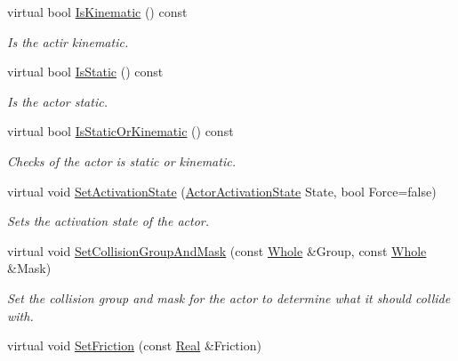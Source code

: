 \begin{DoxyCompactItemize}
virtual bool \hyperlink{classphys_1_1ActorBasePhysicsSettings_a8128bcfc407909a57026eb38812b1d1d}{IsKinematic} () const 
\begin{DoxyCompactList}\small\item\em Is the actir kinematic. \item\end{DoxyCompactList}\item 
virtual bool \hyperlink{classphys_1_1ActorBasePhysicsSettings_a68c32cbe7329e138c5ea11c5b098483f}{IsStatic} () const 
\begin{DoxyCompactList}\small\item\em Is the actor static. \item\end{DoxyCompactList}\item 
virtual bool \hyperlink{classphys_1_1ActorBasePhysicsSettings_a5fe007187584b836ada963f8a23eb377}{IsStaticOrKinematic} () const 
\begin{DoxyCompactList}\small\item\em Checks of the actor is static or kinematic. \item\end{DoxyCompactList}\item 
virtual void \hyperlink{classphys_1_1ActorBasePhysicsSettings_ab0b1760f3730e85470097d44985a5b56}{SetActivationState} (\hyperlink{namespacephys_a7d434b1a52cf5290a9ecc972b87a6a40}{ActorActivationState} State, bool Force=false)
\begin{DoxyCompactList}\small\item\em Sets the activation state of the actor. \item\end{DoxyCompactList}\item 
virtual void \hyperlink{classphys_1_1ActorBasePhysicsSettings_a992771e73cd1f98628618cf75938a5ef}{SetCollisionGroupAndMask} (const \hyperlink{namespacephys_a460f6bc24c8dd347b05e0366ae34f34a}{Whole} \&Group, const \hyperlink{namespacephys_a460f6bc24c8dd347b05e0366ae34f34a}{Whole} \&Mask)
\begin{DoxyCompactList}\small\item\em Set the collision group and mask for the actor to determine what it should collide with. \item\end{DoxyCompactList}\item 
virtual void \hyperlink{classphys_1_1ActorBasePhysicsSettings_ad76ddc51fb8514c1cffa9d5f222b580c}{SetFriction} (const \hyperlink{namespacephys_af7eb897198d265b8e868f45240230d5f}{Real} \&Friction)

\end{DoxyCompactItemize}
